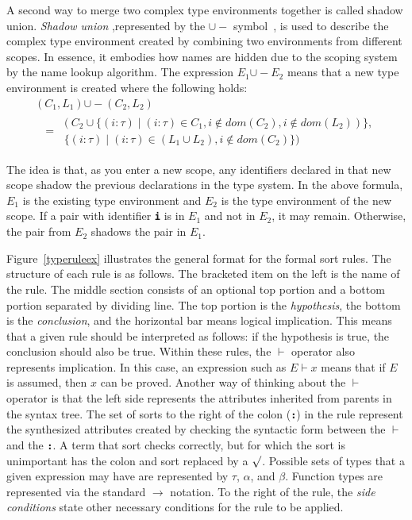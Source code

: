 \documentclass[12pt]{article} %
\newcommand{\reserved}[1]{\textbf{\texttt{#1}}} %
\newcommand{\uminus}{\mbox{$\cup\!\!\!\!-$}}
\begin{document}
A second way to merge two complex type environments together is called
shadow union. \emph{Shadow union} ,represented by the $\uminus$
symbol~\cite{Schmidt}, is used to describe the complex type
environment created by combining two environments from different
scopes. In essence, it embodies how names are hidden due to the scoping system by the name lookup algorithm. The expression $E_1 \uminus E_2$ means that a new type
environment is created where the following holds:
\begin{equation}
\begin{array}{l}
(C_1,L_1) \uminus (C_2,L_2) \\
~~~ =
\begin{array}{l}
(C_2 \cup \{(i:\tau) \mid (i:\tau) \in C_1, i \notin dom(C_2),
                          i \notin dom(L_2))\} , \\
 ~\{(i:\tau) \mid (i:\tau) \in (L_1 \cup L_2), i \notin dom(C_2)\}
)
\end{array}
\end{array}
\end{equation}

The idea is that, as you enter a new scope, any identifiers declared
in that new scope shadow the previous declarations in the type
system. In the above formula, $E_1$ is the existing type environment
and $E_2$ is the type environment of the new scope. If a pair with
identifier \reserved{i} is in $E_1$ and not in $E_2$, it may
remain. Otherwise, the pair from $E_2$ shadows the pair in $E_1$.

Figure~\ref{typeruleex} illustrates the general format for the formal
sort rules. The structure of each rule is as follows. The bracketed
item on the left is the name of the rule. The middle section consists
of an optional top portion and a bottom portion separated by dividing
line. The top portion is the \emph{hypothesis}, the bottom is the
\emph{conclusion}, and the horizontal bar means logical
implication. This means that a given rule should be interpreted as follows:
if the hypothesis is true, the conclusion should also be true. Within
these rules, the $\vdash$ operator also represents implication. In
this case, an expression such as $E \vdash x$ means that if $E$ is
assumed, then $x$ can be proved. Another way of thinking about the
$\vdash$ operator is that the left side represents the attributes
inherited from parents in the syntax tree. The set of sorts to the
right of the colon (\reserved{:}) in the rule represent the
synthesized attributes created by checking the syntactic form between
the $\vdash$ and the \reserved{:}. A
term that sort checks correctly, but for which the sort is unimportant 
has the colon and sort replaced by a $\surd$. Possible
sets of types that a given expression may have are represented by
$\tau$, $\alpha$, and $\beta$. Function types are represented via the
standard $\rightarrow$ notation. To the right of the rule, the
\emph{side conditions} state other necessary conditions for the rule
to be applied.
\end{document}
